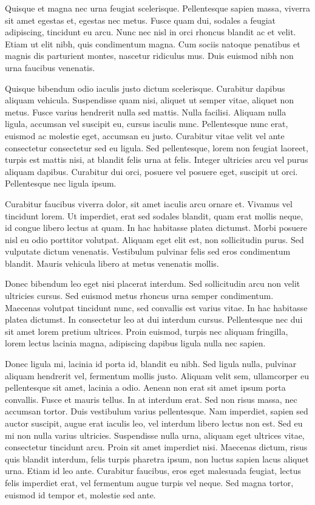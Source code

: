 \documentclass[a4paper]{article}
\begin{document}
Quisque et magna nec urna feugiat scelerisque. Pellentesque sapien massa, viverra sit amet egestas et, egestas nec metus. Fusce quam dui, sodales a feugiat adipiscing, tincidunt eu arcu. Nunc nec nisl in orci rhoncus blandit ac et velit. Etiam ut elit nibh, quis condimentum magna. Cum sociis natoque penatibus et magnis dis parturient montes, nascetur ridiculus mus. Duis euismod nibh non urna faucibus venenatis.

Quisque bibendum odio iaculis justo dictum scelerisque. Curabitur dapibus aliquam vehicula. Suspendisse quam nisi, aliquet ut semper vitae, aliquet non metus. Fusce varius hendrerit nulla sed mattis. Nulla facilisi. Aliquam nulla ligula, accumsan vel suscipit eu, cursus iaculis nunc. Pellentesque nunc erat, euismod ac molestie eget, accumsan eu justo. Curabitur vitae velit vel ante consectetur consectetur sed eu ligula. Sed pellentesque, lorem non feugiat laoreet, turpis est mattis nisi, at blandit felis urna at felis. Integer ultricies arcu vel purus aliquam dapibus. Curabitur dui orci, posuere vel posuere eget, suscipit ut orci. Pellentesque nec ligula ipsum.

Curabitur faucibus viverra dolor, sit amet iaculis arcu ornare et. Vivamus vel tincidunt lorem. Ut imperdiet, erat sed sodales blandit, quam erat mollis neque, id congue libero lectus at quam. In hac habitasse platea dictumst. Morbi posuere nisl eu odio porttitor volutpat. Aliquam eget elit est, non sollicitudin purus. Sed vulputate dictum venenatis. Vestibulum pulvinar felis sed eros condimentum blandit. Mauris vehicula libero at metus venenatis mollis.

Donec bibendum leo eget nisi placerat interdum. Sed sollicitudin arcu non velit ultricies cursus. Sed euismod metus rhoncus urna semper condimentum. Maecenas volutpat tincidunt nunc, sed convallis est varius vitae. In hac habitasse platea dictumst. In consectetur leo at dui interdum cursus. Pellentesque nec dui sit amet lorem pretium ultrices. Proin euismod, turpis nec aliquam fringilla, lorem lectus lacinia magna, adipiscing dapibus ligula nulla nec sapien.

Donec ligula mi, lacinia id porta id, blandit eu nibh. Sed ligula nulla, pulvinar aliquam hendrerit vel, fermentum mollis justo. Aliquam velit sem, ullamcorper eu pellentesque sit amet, lacinia a odio. Aenean non erat sit amet ipsum porta convallis. Fusce et mauris tellus. In at interdum erat. Sed non risus massa, nec accumsan tortor. Duis vestibulum varius pellentesque. Nam imperdiet, sapien sed auctor suscipit, augue erat iaculis leo, vel interdum libero lectus non est. Sed eu mi non nulla varius ultricies. Suspendisse nulla urna, aliquam eget ultrices vitae, consectetur tincidunt arcu. Proin sit amet imperdiet nisi. Maecenas dictum, risus quis blandit interdum, felis turpis pharetra ipsum, non luctus sapien lacus aliquet urna. Etiam id leo ante. Curabitur faucibus, eros eget malesuada feugiat, lectus felis imperdiet erat, vel fermentum augue turpis vel neque. Sed magna tortor, euismod id tempor et, molestie sed ante.
\end{document}
